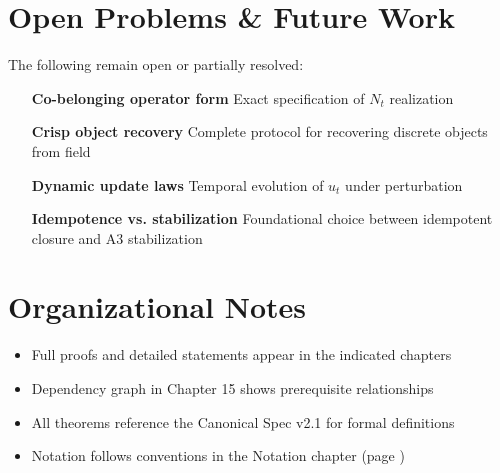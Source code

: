 \section*{Open Problems \& Future Work}

The following remain open or partially resolved:

\begin{enumerate}
  \item[\textbf{Co-belonging operator form}] Exact specification of $N_t$ realization
  \item[\textbf{Crisp object recovery}] Complete protocol for recovering discrete objects from field
  \item[\textbf{Dynamic update laws}] Temporal evolution of $u_t$ under perturbation
  \item[\textbf{Idempotence vs. stabilization}] Foundational choice between idempotent closure and A3 stabilization
\end{enumerate}

\section*{Organizational Notes}

\begin{itemize}
  \item Full proofs and detailed statements appear in the indicated chapters
  \item Dependency graph in Chapter 15 shows prerequisite relationships
  \item All theorems reference the Canonical Spec v2.1 for formal definitions
  \item Notation follows conventions in the Notation chapter (page \pageref{notation})
\end{itemize}

\cleardoublepage
